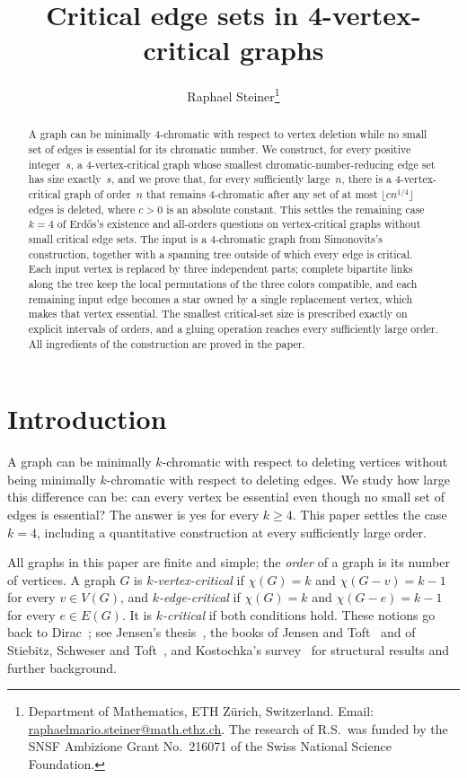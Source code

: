 \documentclass[11pt,letterpaper]{article}
\date{}
\title{Critical edge sets in 4-vertex-critical graphs}
\author{Raphael Steiner\thanks{Department of Mathematics, ETH Z\"urich, Switzerland. Email: \href{mailto:raphaelmario.steiner@math.ethz.ch}{raphaelmario.steiner@math.ethz.ch}. The research of R.S.\ was funded by the SNSF Ambizione Grant No.~216071 of the Swiss National Science Foundation.}}
\numberwithin{equation}{section}
\theoremstyle{plain}
\theoremstyle{definition}
\theoremstyle{remark}
\begin{document}
\maketitle
\thispagestyle{plain}

\begin{abstract}
A graph can be minimally $4$-chromatic with respect to vertex deletion while no small set of edges is essential for its chromatic number. We construct, for every positive integer~$s$, a $4$-vertex-critical graph whose smallest chromatic-number-reducing edge set has size exactly~$s$, and we prove that, for every sufficiently large~$n$, there is a $4$-vertex-critical graph of order~$n$ that remains $4$-chromatic after any set of at most $\lfloor c n^{1/4}\rfloor$ edges is deleted, where $c>0$ is an absolute constant. This settles the remaining case $k=4$ of Erd\H{o}s's existence and all-orders questions on vertex-critical graphs without small critical edge sets. The input is a $4$-chromatic graph from Simonovits's construction, together with a spanning tree outside of which every edge is critical. Each input vertex is replaced by three independent parts; complete bipartite links along the tree keep the local permutations of the three colors compatible, and each remaining input edge becomes a star owned by a single replacement vertex, which makes that vertex essential. The smallest critical-set size is prescribed exactly on explicit intervals of orders, and a gluing operation reaches every sufficiently large order. All ingredients of the construction are proved in the paper.
\end{abstract}

\section{Introduction}\label{sec:intro}

A graph can be minimally $k$-chromatic with respect to deleting vertices without being minimally $k$-chromatic with respect to deleting edges. We study how large this difference can be: can every vertex be essential even though no small set of edges is essential? The answer is yes for every $k\ge 4$. This paper settles the case $k=4$, including a quantitative construction at every sufficiently large order.

All graphs in this paper are finite and simple; the \emph{order} of a graph is its number of vertices. A graph $G$ is \emph{$k$-vertex-critical} if $\chi(G)=k$ and $\chi(G-v)=k-1$ for every $v\in V(G)$, and \emph{$k$-edge-critical} if $\chi(G)=k$ and $\chi(G-e)=k-1$ for every $e\in E(G)$. It is \emph{$k$-critical} if both conditions hold. These notions go back to Dirac~\cite{Dirac1952}; see Jensen's thesis~\cite{JensenThesis}, the books of Jensen and Toft~\cite{JensenToft} and of Stiebitz, Schweser and Toft~\cite{StiebitzSchweserToft}, and Kostochka's survey~\cite{Kostochka} for structural results and further background.
\end{document}
